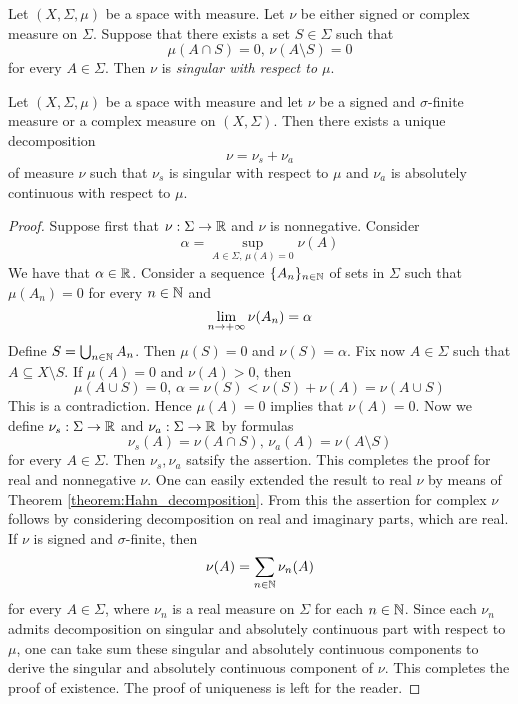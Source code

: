 \begin{definition}
    Let $(X,\Sigma,\mu)$ be a space with measure. Let $\nu$ be either signed or complex measure on $\Sigma$. Suppose that there exists a set $S\in \Sigma$ such that
    $$\mu(A\cap S) = 0,\,\nu(A\setminus S) = 0$$
    for every $A \in \Sigma$. Then $\nu$ is \textit{singular with respect to $\mu$}.
\end{definition}

\begin{theorem}\label{theorem:lebesguede_composition}
    Let $(X,\Sigma,\mu)$ be a space with measure and let $\nu$ be a signed and $\sigma$-finite measure or a complex measure on $(X,\Sigma)$. Then there exists a unique decomposition
    $$\nu = \nu_s + \nu_a$$
    of measure $\nu$ such that $\nu_s$ is singular with respect to $\mu$ and $\nu_a$ is absolutely continuous with respect to $\mu$.
\end{theorem}
\begin{proof}
    Suppose first that $\nu:\Sigma \rightarrow {\mathbb R}$ and $\nu$ is nonnegative. Consider
    $$\alpha = \sup_{A\in \Sigma,\,\mu(A)=0}\nu(A)$$
    We have that $\alpha \in {\mathbb R}$. Consider a sequence $\{A_n\}_{n\in {\mathbb N}}$ of sets in $\Sigma$ such that $\mu(A_n)=0$ for every $n\in {\mathbb N}$ and 
    $$\lim_{n\rightarrow +\infty}\nu(A_n)=\alpha$$
    Define $S = \bigcup_{n\in {\mathbb N}}A_n$. Then $\mu(S) = 0$ and $\nu(S) = \alpha$. Fix now $A\in \Sigma$ such that $A \subseteq X\setminus S$. If $\mu(A) = 0$ and $\nu(A) > 0$, then 
    $$\mu(A\cup S) = 0,\,\alpha = \nu(S) < \nu(S) + \nu(A) = \nu(A\cup S)$$
    This is a contradiction. Hence $\mu(A) = 0$ implies that $\nu(A) = 0$. Now we define $\nu_s:\Sigma \rightarrow {\mathbb R}$ and $\nu_a:\Sigma \rightarrow {\mathbb R}$ by formulas
    $$\nu_s(A) = \nu(A\cap S),\,\nu_a(A) = \nu(A\setminus S)$$
    for every $A\in \Sigma$. Then $\nu_s,\nu_a$ satsify the assertion. This completes the proof for real and nonnegative $\nu$. One can easily extended the result to real $\nu$ by means of Theorem \ref{theorem:Hahn_decomposition}. From this the assertion for complex $\nu$ follows by considering decomposition on real and imaginary parts, which are real. If $\nu$ is signed and $\sigma$-finite, then 
    $$\nu(A) = \sum_{n\in {\mathbb N}}\nu_n(A)$$
    for every $A \in \Sigma$, where $\nu_n$ is a real measure on $\Sigma$ for each $n\in {\mathbb N}$. Since each $\nu_n$ admits decomposition on singular and absolutely continuous part with respect to $\mu$, one can take sum these singular and absolutely continuous components to derive the singular and absolutely continuous component of $\nu$. This completes the proof of existence. The proof of uniqueness is left for the reader.
\end{proof}

